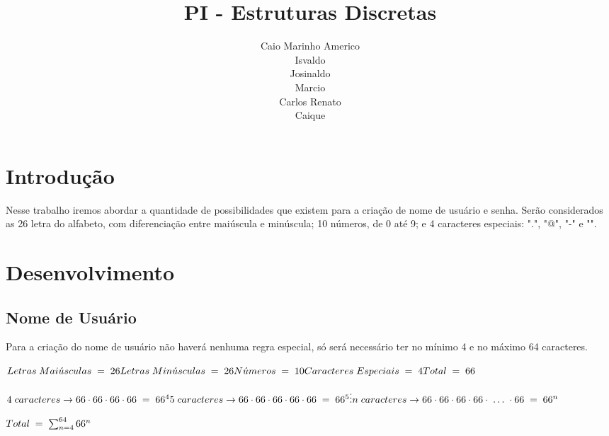 \documentclass[]{article}
\title{PI - Estruturas Discretas}
\date{}
\author{Caio Marinho Americo \\ Isvaldo \\ Josinaldo \\ Marcio \\ Carlos Renato \\ Caique}
\begin{document}
\begin{titlepage}
	\maketitle
\end{titlepage}

 
\section{Introdução}
 Nesse trabalho iremos abordar a quantidade de possibilidades que existem para a criação de nome de usuário e senha. Serão considerados as 26 letra do alfabeto, com diferenciação entre maiúscula e minúscula; 10 números, de 0 até 9; e 4 caracteres especiais: ".", "@", "\--" e "\textunderscore".
 
 
 \section{Desenvolvimento}
 \subsection{Nome de Usuário}
 
 Para a criação do nome de usuário não haverá nenhuma regra especial, só será necessário ter no mínimo 4 e no máximo 64 caracteres.
 
 \begin{math}
 \\Letras\;Mai\acute{u}sculas\;=\;26
 \\Letras\;Min\acute{u}sculas\;=\;26
 \\N\acute{u}meros\;=\;10
 \\Caracteres\;Especiais\;=\;4
 \\Total\;=\;66
 \end{math}
 
 \begin{math}
 \\4\;caracteres \rightarrow 66\cdot66\cdot66\cdot66\;=\;66^{4} 
 \\5\;caracteres \rightarrow 66\cdot66\cdot66\cdot66\cdot66\;=\;66^{5}
 \\\vdots
 \\n\;caracteres \rightarrow 66\cdot66\cdot66\cdot66\cdot \;\ldots\; \cdot66\;=\;66^{n}  
 \end{math}
 
 \begin{math}
 \\Total\;=\;\sum_{n = 4}^{64}66^{n} 
 \end{math}
 
\end{document}
